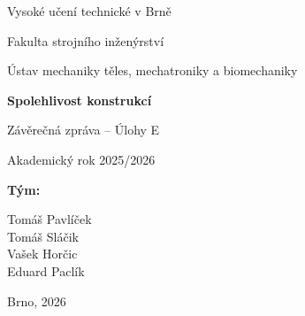 \documentclass[a4paper,11pt]{article}
\begin{document}
\begin{titlepage}
    \centering
    \vspace*{1.5cm}
    {\large Vysoké učení technické v Brně\par}
    {\large Fakulta strojního inženýrství\par}
    {\large Ústav mechaniky těles, mechatroniky a biomechaniky\par}
    \vspace{3cm}

    {\Huge\bfseries Spolehlivost konstrukcí\par}
    \vspace{0.8cm}
    {\LARGE Závěrečná zpráva -- Úlohy E\par}
    \vspace{0.5cm}
    {\large Akademický rok 2025/2026\par}

    \vspace{3cm}
    {\large\bfseries Tým:\par}
    \vspace{0.4cm}
    {\large
        Tomáš Pavlíček\\[2pt]
        Tomáš Sláčik\\[2pt]
        Vašek Horčic\\[2pt]
        Eduard Paclík\par
    }

    \vfill
    {\large Brno, 2026\par}
\end{titlepage}

\tableofcontents
\clearpage





\end{document}
